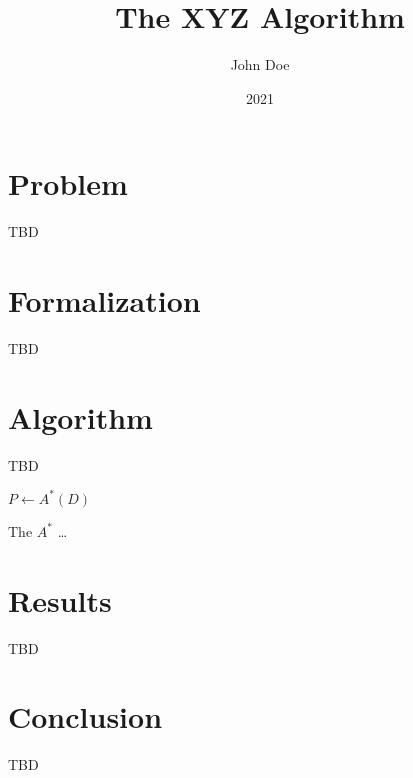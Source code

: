 \documentclass{article}
\title{The XYZ Algorithm}
\date{2021}
\author{John Doe}
\begin{document}
\maketitle

\section{Problem}
TBD

\section{Formalization}
TBD

\section{Algorithm}
TBD

\begin{algorithm}[!ht]
	
	\vspace{1em}
	\vspace{0.5em}
	\( P \gets \mathit{A^*}(D) \)

	\vspace{1em}
	\caption{The \( A^* \) \dots}%
	\label{a:a_star}
\end{algorithm}

\section{Results}
TBD

\section{Conclusion}
TBD
\end{document}
